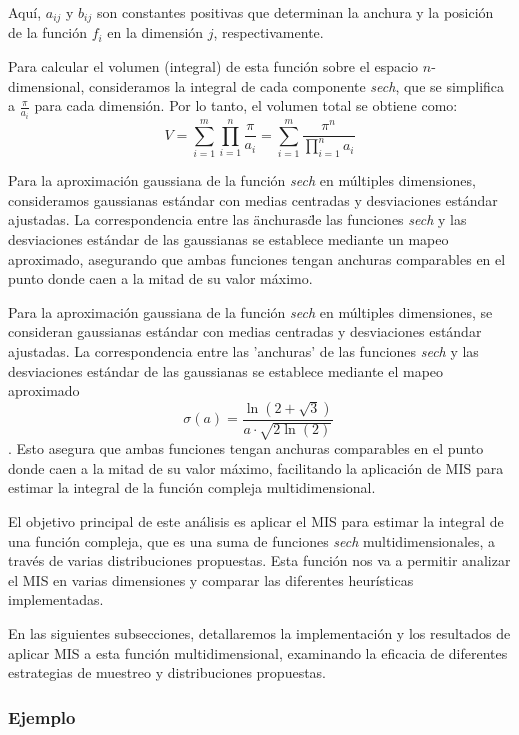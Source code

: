 \documentclass{article}
\begin{document}
Aquí, \( a_{ij} \) y \( b_{ij} \) son constantes positivas que determinan la anchura y la posición de la función \( f_i \) en la dimensión \( j \), respectivamente.

Para calcular el volumen (integral) de esta función sobre el espacio \( n \)-dimensional, consideramos la integral de cada componente \textit{sech}, que se simplifica a \( \frac{\pi}{a_i} \) para cada dimensión. Por lo tanto, el volumen total se obtiene como:
\[ V = \sum_{i=1}^{m} \prod_{i=1}^{n} \frac{\pi}{a_i} = \sum_{i=1}^{m} \frac{\pi^n}{\prod_{i=1}^{n} a_i} \]

Para la aproximación gaussiana de la función \textit{sech} en múltiples dimensiones, consideramos gaussianas estándar con medias centradas y desviaciones estándar ajustadas.
La correspondencia entre las \"anchuras\" de las funciones \textit{sech} y las desviaciones estándar de las gaussianas se establece mediante un mapeo aproximado, asegurando que ambas funciones tengan anchuras comparables en el punto donde caen a la mitad de su valor máximo.

Para la aproximación gaussiana de la función \textit{sech} en múltiples dimensiones, se consideran gaussianas estándar con medias centradas y desviaciones estándar ajustadas.
La correspondencia entre las 'anchuras' de las funciones \textit{sech} y las desviaciones estándar de las gaussianas se establece mediante el mapeo aproximado $$ \sigma(a) = \frac{\ln(2 + \sqrt{3})}{a \cdot \sqrt{2\ln(2)}} \ $$.
Esto asegura que ambas funciones tengan anchuras comparables en el punto donde caen a la mitad de su valor máximo, facilitando la aplicación de MIS para estimar la integral de la función compleja multidimensional.


El objetivo principal de este análisis es aplicar el MIS para estimar la integral de una función compleja, que es una suma de funciones \textit{sech} multidimensionales, a través de varias distribuciones propuestas.
Esta función nos va a permitir analizar el MIS en varias dimensiones y comparar las diferentes heurísticas implementadas.

En las siguientes subsecciones, detallaremos la implementación y los resultados de aplicar MIS a esta función multidimensional, examinando la eficacia de diferentes estrategias de muestreo y distribuciones propuestas.

\subsubsection{Ejemplo}
\end{document}
